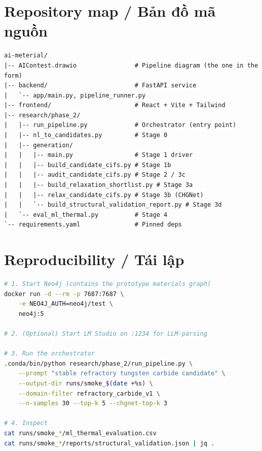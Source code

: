 \documentclass[11pt,a4paper]{report}
\begin{document}
\appendix

\chapter{Repository map / Bản đồ mã nguồn}
\begin{lstlisting}[language={},caption={Top-level repo layout.},label={lst:tree}]
ai-meterial/
|-- AIContest.drawio                # Pipeline diagram (the one in the form)
|-- backend/                        # FastAPI service
|   `-- app/main.py, pipeline_runner.py
|-- frontend/                       # React + Vite + Tailwind
|-- research/phase_2/
|   |-- run_pipeline.py             # Orchestrator (entry point)
|   |-- nl_to_candidates.py         # Stage 0
|   |-- generation/
|   |   |-- main.py                 # Stage 1 driver
|   |   |-- build_candidate_cifs.py # Stage 1b
|   |   |-- audit_candidate_cifs.py # Stage 2 / 3c
|   |   |-- build_relaxation_shortlist.py # Stage 3a
|   |   |-- relax_candidate_cifs.py # Stage 3b (CHGNet)
|   |   `-- build_structural_validation_report.py # Stage 3d
|   `-- eval_ml_thermal.py          # Stage 4
`-- requirements.yaml               # Pinned deps
\end{lstlisting}

\chapter{Reproducibility / Tái lập}

\begin{lstlisting}[language=bash,caption={Reproducing a run from scratch.},label={lst:repro}]
# 1. Start Neo4j (contains the prototype materials graph)
docker run -d --rm -p 7687:7687 \
    -e NEO4J_AUTH=neo4j/test \
    neo4j:5

# 2. (Optional) Start LM Studio on :1234 for LLM-parsing

# 3. Run the orchestrator
.conda/bin/python research/phase_2/run_pipeline.py \
    --prompt "stable refractory tungsten carbide candidate" \
    --output-dir runs/smoke_$(date +%s) \
    --domain-filter refractory_carbide_v1 \
    --n-samples 30 --top-k 5 --chgnet-top-k 3

# 4. Inspect
cat runs/smoke_*/ml_thermal_evaluation.csv
cat runs/smoke_*/reports/structural_validation.json | jq .
\end{lstlisting}
\end{document}
